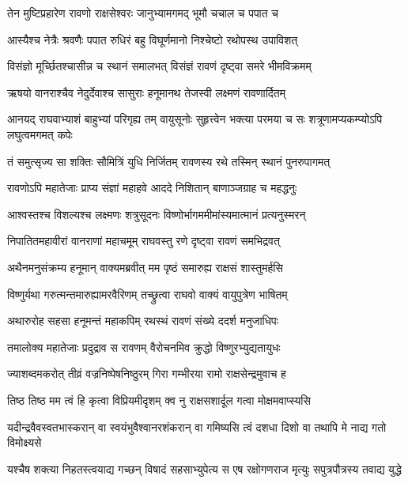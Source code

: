 \twolineshloka
{तेन मुष्टिप्रहारेण रावणो राक्षसेश्वरः}
{जानुभ्यामगमद् भूमौ चचाल च पपात च} %

\twolineshloka
{आस्यैश्च नेत्रैः श्रवणैः पपात रुधिरं बहु}
{विघूर्णमानो निश्चेष्टो रथोपस्थ उपाविशत्} %

\twolineshloka
{विसंज्ञो मूर्च्छितश्चासीन्न च स्थानं समालभत्}
{विसंज्ञं रावणं दृष्ट्वा समरे भीमविक्रमम्} %

\twolineshloka
{ऋषयो वानराश्चैव नेदुर्देवाश्च सासुराः}
{हनूमानथ तेजस्वी लक्ष्मणं रावणार्दितम्} %

\threelineshloka
{आनयद् राघवाभ्याशं बाहुभ्यां परिगृह्य तम्}
{वायुसूनोः सुहृत्त्वेन भक्त्या परमया च सः}
{शत्रूणामप्यकम्प्योऽपि लघुत्वमगमत् कपेः} %

\twolineshloka
{तं समुत्सृज्य सा शक्तिः सौमित्रिं युधि निर्जितम्}
{रावणस्य रथे तस्मिन् स्थानं पुनरुपागमत्} %

\twolineshloka
{रावणोऽपि महातेजाः प्राप्य संज्ञां महाहवे}
{आददे निशितान् बाणाञ्जग्राह च महद्धनुः} %

\twolineshloka
{आश्वस्तश्च विशल्यश्च लक्ष्मणः शत्रुसूदनः}
{विष्णोर्भागममीमांस्यमात्मानं प्रत्यनुस्मरन्} %

\twolineshloka
{निपातितमहावीरां वानराणां महाचमूम्}
{राघवस्तु रणे दृष्ट्वा रावणं समभिद्रवत्} %

\twolineshloka
{अथैनमनुसंक्रम्य हनूमान् वाक्यमब्रवीत्}
{मम पृष्ठं समारुह्य राक्षसं शास्तुमर्हसि} %

\twolineshloka
{विष्णुर्यथा गरुत्मन्तमारुह्यामरवैरिणम्}
{तच्छ्रुत्वा राघवो वाक्यं वायुपुत्रेण भाषितम्} %

\twolineshloka
{अथारुरोह सहसा हनूमन्तं महाकपिम्}
{रथस्थं रावणं संख्ये ददर्श मनुजाधिपः} %

\twolineshloka
{तमालोक्य महातेजाः प्रदुद्राव स रावणम्}
{वैरोचनमिव क्रुद्धो विष्णुरभ्युद्यतायुधः} %

\twolineshloka
{ज्याशब्दमकरोत् तीव्रं वज्रनिष्पेषनिष्ठुरम्}
{गिरा गम्भीरया रामो राक्षसेन्द्रमुवाच ह} %

\twolineshloka
{तिष्ठ तिष्ठ मम त्वं हि कृत्वा विप्रियमीदृशम्}
{क्व नु राक्षसशार्दूल गत्वा मोक्षमवाप्स्यसि} %

\twolineshloka
{यदीन्द्रवैवस्वतभास्करान् वा स्वयंभुवैश्वानरशंकरान् वा}
{गमिष्यसि त्वं दशधा दिशो वा तथापि मे नाद्य गतो विमोक्ष्यसे} %

\twolineshloka
{यश्चैष शक्त्या निहतस्त्वयाद्य गच्छन् विषादं सहसाभ्युपेत्य}
{स एष रक्षोगणराज मृत्युः सपुत्रपौत्रस्य तवाद्य युद्धे} %

